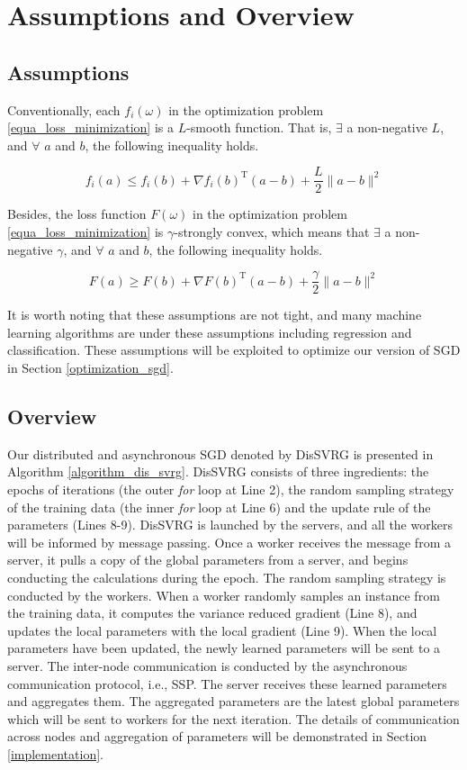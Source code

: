 \documentclass[preprint,review,11pt,a4paper]{elsarticle}
\begin{document}
\section{Assumptions and Overview}
\label{overview}
\subsection{Assumptions}
Conventionally, each $f_i(\omega)$ in the optimization problem \ref{equa_loss_minimization} is a $L$-smooth function. That is, $\exists$ a non-negative $L$, and $\forall$ $a$ and $b$, the following inequality holds.

\begin{equation}
\label{equa_l_smooth}
f_i(a)\le f_i(b)+\nabla f_i(b)^\mathrm{T} (a-b)+\frac{L}{2}\parallel a-b\parallel^2
 \end{equation}

Besides, the loss function $F(\omega)$  in the optimization problem \ref{equa_loss_minimization} is $\gamma$-strongly convex, which means that $\exists$ a non-negative $\gamma$, and $\forall$ $a$ and $b$, the following inequality holds.

\begin{equation}
\label{equa_gamma_convex}
F(a)\ge F(b)+\nabla F(b)^\mathrm{T} (a-b)+\frac{\gamma}{2}\parallel a-b\parallel^2
\end{equation}

It is worth noting that these assumptions are not tight, and many machine learning algorithms are under these assumptions including regression and classification. These assumptions will be exploited to optimize our version of SGD in Section \ref{optimization_sgd}.

\subsection{Overview}
Our distributed and asynchronous SGD denoted by DisSVRG is presented  in Algorithm \ref{algorithm_dis_svrg}. DisSVRG consists of three ingredients: the epochs of iterations (the outer \emph{for} loop at Line 2), the random sampling strategy of the training data (the inner \emph{for} loop at Line 6) and the update rule of the parameters (Lines 8-9). DisSVRG is launched by the servers, and all the workers will be informed by message passing. Once a worker receives the message from a server, it pulls a copy of the global parameters from a server, and  begins conducting the calculations during the epoch. The random sampling strategy is conducted by the workers. When a worker randomly samples an instance from the training data, it computes the variance reduced gradient (Line 8), and updates the local parameters with the local gradient (Line 9). When the local parameters have been updated, the newly learned parameters will be sent to a server. The inter-node communication is conducted by the asynchronous communication protocol, i.e., SSP. The server receives these learned parameters  and aggregates them. The aggregated parameters are the latest global parameters which will be sent to workers for the next iteration. The details of communication across nodes and aggregation of parameters will be demonstrated in Section \ref{implementation}.
\end{document}
